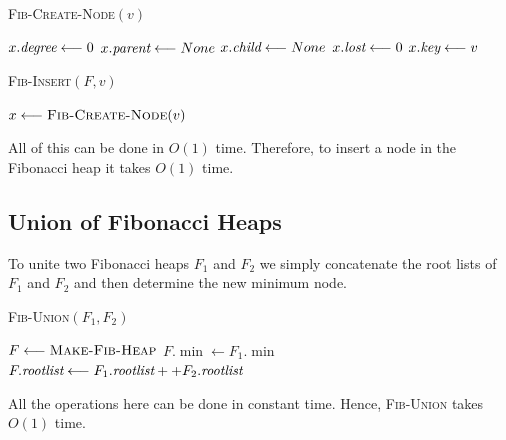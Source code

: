 \begin{minipage}{0.45\textwidth}
	\begin{algorithm}[H]
		\DontPrintSemicolon
		\caption{\textsc{Fib-Create-Node}$(v)$}
		$x.\emph{degree}\longleftarrow 0$\;
		$x.\emph{parent}\longleftarrow None$\;
		$x.\emph{child}\longleftarrow None$\;
		$x.\emph{lost}\longleftarrow 0$\;
		$x.\emph{key}\longleftarrow v$\;
	\end{algorithm}
\end{minipage}\hfill
\begin{minipage}{0.45\textwidth}
	\begin{algorithm}[H]
		\DontPrintSemicolon
		\caption{\textsc{Fib-Insert}$(F,v)$}
		$x\longleftarrow \textsc{Fib-Create-Node}(v)$\;
	\end{algorithm}
\end{minipage}

All of this can be done in $O(1)$ time. Therefore, to insert a node in the Fibonacci heap it takes $O(1)$ time.
\subsection{Union of Fibonacci Heaps}
To unite two Fibonacci heaps $F_1$ and $F_2$ we simply concatenate the root lists of $F_1$ and $F_2$ and then determine the new minimum node.
\begin{algorithm}
	\DontPrintSemicolon
	\caption{\textsc{Fib-Union}$(F_1,F_2)$}
	$F\longleftarrow \textsc{Make-Fib-Heap}$\;
	$F.\min\longleftarrow F_1.\min$\;
	$F.\emph{rootlist}\longleftarrow F_1.\emph{rootlist} ++ F_2.\emph{rootlist}$\;
\end{algorithm}
All the operations here can be done in constant time. Hence, \textsc{Fib-Union} takes $O(1)$ time.
